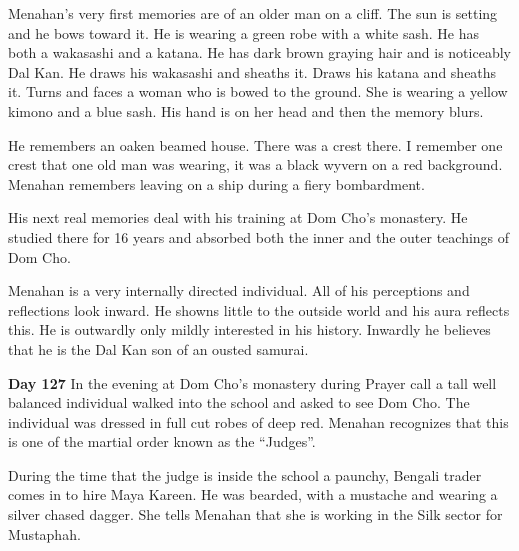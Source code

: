 \documentclass[10pt]{report}
\begin{document}
Menahan's very first memories are of an older man on a cliff. The sun is
setting and he bows toward it. He is wearing a green robe with a white
sash. He has both a wakasashi and a katana. He has dark brown graying
hair and is noticeably Dal Kan. He draws his wakasashi and sheaths it.
Draws his katana and sheaths it. Turns and faces a woman who is bowed to
the ground. She is wearing a yellow kimono and a blue sash. His hand is
on her head and then the memory blurs.

He remembers an oaken beamed house. There was a crest there. I remember
one crest that one old man was wearing, it was a black wyvern on a red
background. Menahan remembers leaving on a ship during a fiery
bombardment.

His next real memories deal with his training at Dom Cho's
monastery. He studied there for 16 years and absorbed both the
inner and the outer teachings of Dom Cho.

Menahan is a very internally directed individual. All of his perceptions
and reflections look inward. He showns little to the outside world and
his aura reflects this. He is outwardly only mildly interested in his
history. Inwardly he believes that he is the Dal Kan son of an ousted
samurai.


{\bf Day 127}
In the evening at Dom Cho's monastery during Prayer call a tall well
balanced individual walked into the school and asked to see Dom Cho. The
individual was dressed in full cut robes of deep red. Menahan recognizes
that this is one of the martial order known as the ``Judges''.

During the time that the judge is inside the school a paunchy,
Bengali trader comes in to hire Maya Kareen. He was bearded, with a
mustache and wearing a silver chased dagger. She tells Menahan that she is
working in the Silk sector for Mustaphah.
\end{document}
